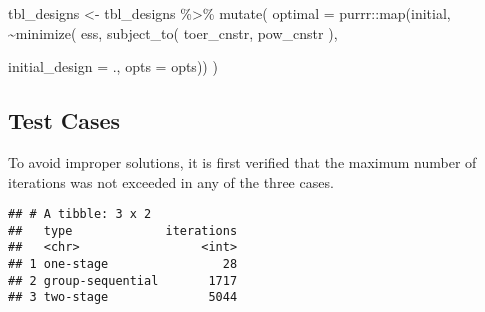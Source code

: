 \documentclass[
]{book}
\newenvironment{Shaded}{\begin{snugshade}}{\end{snugshade}}
\newcommand{\AttributeTok}[1]{\textcolor[rgb]{0.77,0.63,0.00}{#1}}
\newcommand{\FunctionTok}[1]{\textcolor[rgb]{0.00,0.00,0.00}{#1}}
\newcommand{\NormalTok}[1]{#1}
\newcommand{\OtherTok}[1]{\textcolor[rgb]{0.56,0.35,0.01}{#1}}
\newcommand{\SpecialCharTok}[1]{\textcolor[rgb]{0.00,0.00,0.00}{#1}}
\begin{document}
\begin{Shaded}
\begin{Highlighting}[]
\NormalTok{tbl\_designs }\OtherTok{\textless{}{-}}\NormalTok{ tbl\_designs }\SpecialCharTok{\%\textgreater{}\%} 
    \FunctionTok{mutate}\NormalTok{(}
       \AttributeTok{optimal =}\NormalTok{ purrr}\SpecialCharTok{::}\FunctionTok{map}\NormalTok{(initial, }\SpecialCharTok{\textasciitilde{}}\FunctionTok{minimize}\NormalTok{(}
\NormalTok{          ess,}
          \FunctionTok{subject\_to}\NormalTok{(}
\NormalTok{              toer\_cnstr,}
\NormalTok{              pow\_cnstr}
\NormalTok{          ),}
          
          \AttributeTok{initial\_design =}\NormalTok{ ., }
          \AttributeTok{opts           =}\NormalTok{ opts)) )}
\end{Highlighting}
\end{Shaded}

\hypertarget{test-cases-14}{%
\subsection{Test Cases}\label{test-cases-14}}

To avoid improper solutions, it is first verified that the maximum
number of iterations was not exceeded in any of the three cases.

\begin{Shaded}
\end{Shaded}

\begin{verbatim}
## # A tibble: 3 x 2
##   type             iterations
##   <chr>                 <int>
## 1 one-stage                28
## 2 group-sequential       1717
## 3 two-stage              5044
\end{verbatim}
\end{document}
